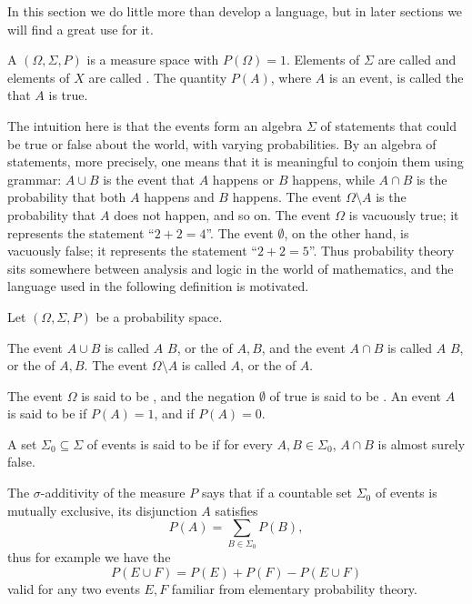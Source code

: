 In this section we do little more than develop a language, but in later sections we will find a great use for it.

\begin{definition}
A  $(\Omega, \Sigma, P)$ is a measure space with $P(\Omega) = 1$.
Elements of $\Sigma$ are called  and elements of $X$ are called .
The quantity $P(A)$, where $A$ is an event, is called the  that $A$ is true.
\end{definition}

\begin{subsec}
The intuition here is that the events form an algebra $\Sigma$ of statements that could be true or false about the world, with varying probabilities.
By an algebra of statements, more precisely, one means that it is meaningful to conjoin them using grammar: $A \cup B$ is the event that $A$ happens or $B$ happens, while $A \cap B$ is the probability that both $A$ happens and $B$ happens. The event $\Omega \setminus A$ is the probability that $A$ does not happen, and so on.
The event $\Omega$ is vacuously true; it represents the statement ``$2 + 2 = 4$''.
The event $\emptyset$, on the other hand, is vacuously false; it represents the statement ``$2 + 2 = 5$''.
Thus probability theory sits somewhere between analysis and logic in the world of mathematics, and the language used in the following definition is motivated.
\end{subsec}

\begin{definition}
Let $(\Omega, \Sigma, P)$ be a probability space.

The event $A \cup B$ is called $A$  $B$, or the  of $A,B$, and the event $A \cap B$ is called $A$  $B$, or the  of $A,B$.
The event $\Omega \setminus A$ is called  $A$, or the  of $A$.

The event $\Omega$ is said to be , and the negation $\emptyset$ of true is said to be .
An event $A$ is said to be  if $P(A) = 1$, and  if $P(A) = 0$.

A set $\Sigma_0 \subseteq \Sigma$ of events is said to be  if for every $A, B \in \Sigma_0$, $A \cap B$ is almost surely false.
\end{definition}

\begin{subsec}
The $\sigma$-additivity of the measure $P$ says that if a countable set $\Sigma_0$ of events is mutually exclusive, its disjunction $A$ satisfies
\[P(A) = \sum_{B \in \Sigma_0} P(B),\]
thus for example we have the 
\[P(E \cup F) = P(E) + P(F) - P(E \cup F)\]
valid for any two events $E,F$ familiar from elementary probability theory.
\end{subsec}


